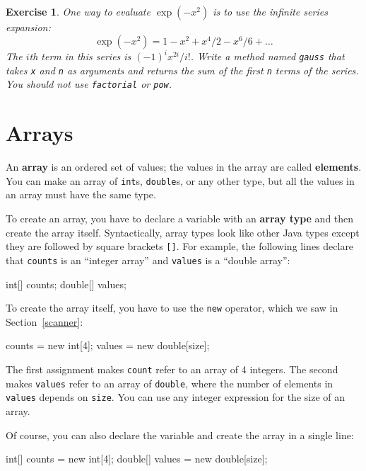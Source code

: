 \documentclass[12pt]{book}
\theoremstyle{exercise}
\newtheorem{exercise}{Exercise}[chapter]
\newcommand{\java}[1]{\verb"#1"}
\newcommand{\java}[1]{\lstinline{#1}} %
\begin{document}
\begin{exercise}

One way to evaluate $\exp(-x^2)$ is to use the infinite series expansion:
%
\[ \exp(-x^2) = 1 - x^2 + x^4/2 - x^6/6 + \ldots \]
%
The $i$th term in this series is $(-1)^i x^{2i} / i!$.
Write a method named \java{gauss} that takes \java{x} and \java{n} as arguments and returns the sum of the first \java{n} terms of the series.
You should not use \java{factorial} or \java{pow}.

\end{exercise}


\chapter{Arrays}
\label{arrays}


An {\bf array} is an ordered set of values; the values in the array are
called {\bf elements}.
You can make an array of \java{int}s, \java{double}s, or any other type, but all the values in an array must have the same type.

To create an array, you have to declare a variable with an {\bf array type} and then create the array itself.
Syntactically, array types look like other Java types except they are followed by square brackets \java{[]}.
For example, the following lines declare that \java{counts} is an ``integer array'' and \java{values} is a ``double array'':

\begin{code}
    int[] counts;
    double[] values;
\end{code}

To create the array itself, you have to use the \java{new} operator, which we saw in Section~\ref{scanner}:

\begin{code}
    counts = new int[4];
    values = new double[size];
\end{code}

The first assignment makes \java{count} refer to an array of 4 integers.
The second makes \java{values} refer to an array of \java{double}, where the number of elements in \java{values} depends on \java{size}.
You can use any integer expression for the size of an array.

Of course, you can also declare the variable and create the array in a single line:

\begin{code}
    int[] counts = new int[4];
    double[] values = new double[size];
\end{code}
\end{document}
